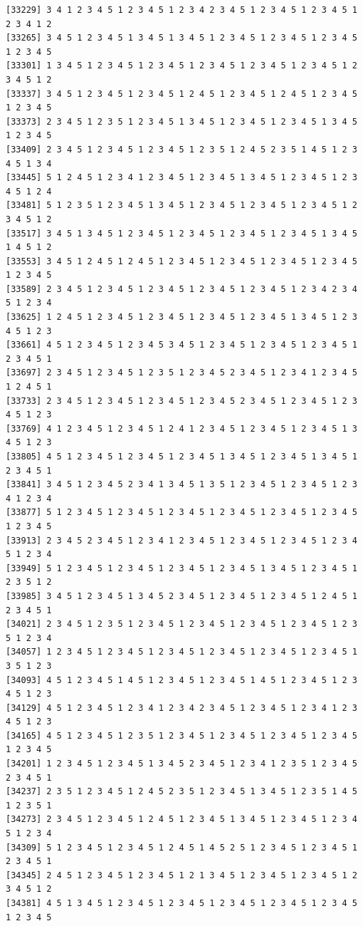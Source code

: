 \documentclass[
  english,
]{book}
\begin{document}
\begin{verbatim}
[33229] 3 4 1 2 3 4 5 1 2 3 4 5 1 2 3 4 2 3 4 5 1 2 3 4 5 1 2 3 4 5 1 2 3 4 1 2
[33265] 3 4 5 1 2 3 4 5 1 3 4 5 1 3 4 5 1 2 3 4 5 1 2 3 4 5 1 2 3 4 5 1 2 3 4 5
[33301] 1 3 4 5 1 2 3 4 5 1 2 3 4 5 1 2 3 4 5 1 2 3 4 5 1 2 3 4 5 1 2 3 4 5 1 2
[33337] 3 4 5 1 2 3 4 5 1 2 3 4 5 1 2 4 5 1 2 3 4 5 1 2 4 5 1 2 3 4 5 1 2 3 4 5
[33373] 2 3 4 5 1 2 3 5 1 2 3 4 5 1 3 4 5 1 2 3 4 5 1 2 3 4 5 1 3 4 5 1 2 3 4 5
[33409] 2 3 4 5 1 2 3 4 5 1 2 3 4 5 1 2 3 5 1 2 4 5 2 3 5 1 4 5 1 2 3 4 5 1 3 4
[33445] 5 1 2 4 5 1 2 3 4 1 2 3 4 5 1 2 3 4 5 1 3 4 5 1 2 3 4 5 1 2 3 4 5 1 2 4
[33481] 5 1 2 3 5 1 2 3 4 5 1 3 4 5 1 2 3 4 5 1 2 3 4 5 1 2 3 4 5 1 2 3 4 5 1 2
[33517] 3 4 5 1 3 4 5 1 2 3 4 5 1 2 3 4 5 1 2 3 4 5 1 2 3 4 5 1 3 4 5 1 4 5 1 2
[33553] 3 4 5 1 2 4 5 1 2 4 5 1 2 3 4 5 1 2 3 4 5 1 2 3 4 5 1 2 3 4 5 1 2 3 4 5
[33589] 2 3 4 5 1 2 3 4 5 1 2 3 4 5 1 2 3 4 5 1 2 3 4 5 1 2 3 4 2 3 4 5 1 2 3 4
[33625] 1 2 4 5 1 2 3 4 5 1 2 3 4 5 1 2 3 4 5 1 2 3 4 5 1 3 4 5 1 2 3 4 5 1 2 3
[33661] 4 5 1 2 3 4 5 1 2 3 4 5 3 4 5 1 2 3 4 5 1 2 3 4 5 1 2 3 4 5 1 2 3 4 5 1
[33697] 2 3 4 5 1 2 3 4 5 1 2 3 5 1 2 3 4 5 2 3 4 5 1 2 3 4 1 2 3 4 5 1 2 4 5 1
[33733] 2 3 4 5 1 2 3 4 5 1 2 3 4 5 1 2 3 4 5 2 3 4 5 1 2 3 4 5 1 2 3 4 5 1 2 3
[33769] 4 1 2 3 4 5 1 2 3 4 5 1 2 4 1 2 3 4 5 1 2 3 4 5 1 2 3 4 5 1 3 4 5 1 2 3
[33805] 4 5 1 2 3 4 5 1 2 3 4 5 1 2 3 4 5 1 3 4 5 1 2 3 4 5 1 3 4 5 1 2 3 4 5 1
[33841] 3 4 5 1 2 3 4 5 2 3 4 1 3 4 5 1 3 5 1 2 3 4 5 1 2 3 4 5 1 2 3 4 1 2 3 4
[33877] 5 1 2 3 4 5 1 2 3 4 5 1 2 3 4 5 1 2 3 4 5 1 2 3 4 5 1 2 3 4 5 1 2 3 4 5
[33913] 2 3 4 5 2 3 4 5 1 2 3 4 1 2 3 4 5 1 2 3 4 5 1 2 3 4 5 1 2 3 4 5 1 2 3 4
[33949] 5 1 2 3 4 5 1 2 3 4 5 1 2 3 4 5 1 2 3 4 5 1 3 4 5 1 2 3 4 5 1 2 3 5 1 2
[33985] 3 4 5 1 2 3 4 5 1 3 4 5 2 3 4 5 1 2 3 4 5 1 2 3 4 5 1 2 4 5 1 2 3 4 5 1
[34021] 2 3 4 5 1 2 3 5 1 2 3 4 5 1 2 3 4 5 1 2 3 4 5 1 2 3 4 5 1 2 3 5 1 2 3 4
[34057] 1 2 3 4 5 1 2 3 4 5 1 2 3 4 5 1 2 3 4 5 1 2 3 4 5 1 2 3 4 5 1 3 5 1 2 3
[34093] 4 5 1 2 3 4 5 1 4 5 1 2 3 4 5 1 2 3 4 5 1 4 5 1 2 3 4 5 1 2 3 4 5 1 2 3
[34129] 4 5 1 2 3 4 5 1 2 3 4 1 2 3 4 2 3 4 5 1 2 3 4 5 1 2 3 4 1 2 3 4 5 1 2 3
[34165] 4 5 1 2 3 4 5 1 2 3 5 1 2 3 4 5 1 2 3 4 5 1 2 3 4 5 1 2 3 4 5 1 2 3 4 5
[34201] 1 2 3 4 5 1 2 3 4 5 1 3 4 5 2 3 4 5 1 2 3 4 1 2 3 5 1 2 3 4 5 2 3 4 5 1
[34237] 2 3 5 1 2 3 4 5 1 2 4 5 2 3 5 1 2 3 4 5 1 3 4 5 1 2 3 5 1 4 5 1 2 3 5 1
[34273] 2 3 4 5 1 2 3 4 5 1 2 4 5 1 2 3 4 5 1 3 4 5 1 2 3 4 5 1 2 3 4 5 1 2 3 4
[34309] 5 1 2 3 4 5 1 2 3 4 5 1 2 4 5 1 4 5 2 5 1 2 3 4 5 1 2 3 4 5 1 2 3 4 5 1
[34345] 2 4 5 1 2 3 4 5 1 2 3 4 5 1 2 1 3 4 5 1 2 3 4 5 1 2 3 4 5 1 2 3 4 5 1 2
[34381] 4 5 1 3 4 5 1 2 3 4 5 1 2 3 4 5 1 2 3 4 5 1 2 3 4 5 1 2 3 4 5 1 2 3 4 5

\end{verbatim}
\end{document}
